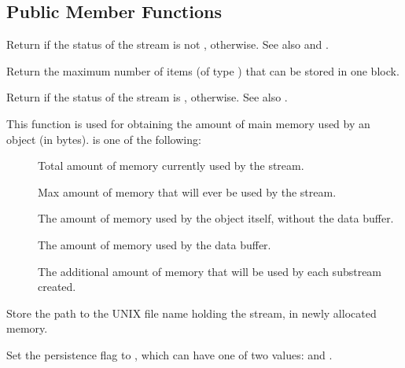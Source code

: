 \subsection{Public Member Functions}
  \btabb

     {Return  if the
    status of the stream is not
    ,  otherwise. See
    also  and .}

     {Return the maximum number of items (of type
    ) that can be stored in one block.}

     {Return  if the
    status of the stream is ,
     otherwise. See also .}

     {This function is used for obtaining the amount of main memory used by an
 object (in bytes).  is one of the
following:
\begin{description}
  \item[] Total amount of memory currently
used by the stream.
  \item[] Max amount of memory that will
ever be used by the stream.
  \item[] The amount of memory used by
the object itself, without the data buffer.
  \item[]  The amount of memory used by the
data buffer.
  \item[] The additional amount of
memory that will be used by  each substream created.
\end{description}
}

     {Store the path to the UNIX
file name holding the stream, in newly allocated memory.}

     {Set the persistence flag to ,
    which can have one of two values:  and
    .}

